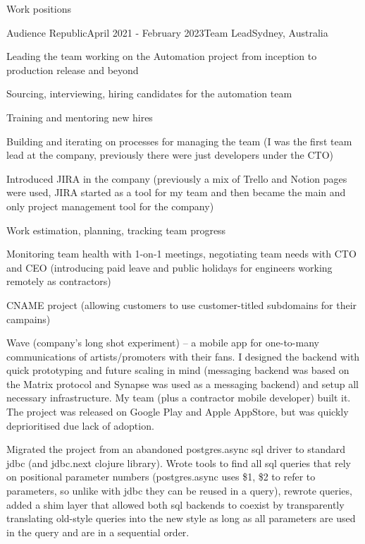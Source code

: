 \documentclass{resume} %
\begin{document}
\begin{rSection}{Work positions}
\begin{rSubsection}{Audience Republic}{April 2021 - February 2023}{Team Lead}{Sydney, Australia} %
\item Leading the team working on the Automation project from inception to production release and beyond
\item Sourcing, interviewing, hiring candidates for the automation team
\item Training and mentoring new hires
\item Building and iterating on processes for managing the team (I was the first team lead at the company,
    previously there were just developers under the CTO)
\item Introduced JIRA in the company (previously a mix of Trello and Notion pages were used, JIRA started as
    a tool for my team and then became the main and only project management tool for the company)
\item Work estimation, planning, tracking team progress
\item Monitoring team health with 1-on-1 meetings, negotiating team needs with CTO and CEO (introducing
    paid leave and public holidays for engineers working remotely as contractors)
\item CNAME project (allowing customers to use customer-titled subdomains for their campains)
\item Wave (company's long shot experiment) -- a mobile app for one-to-many communications of artists/promoters
    with their fans. I designed the backend with quick prototyping and future scaling in mind (messaging
    backend was based on the Matrix protocol and Synapse was used as a messaging backend) and setup all
    necessary infrastructure. My team (plus a contractor mobile developer) built it. The project was released
    on Google Play and Apple AppStore, but was quickly deprioritised due lack of adoption.
\item Migrated the project from an abandoned postgres.async sql driver to standard jdbc (and jdbc.next clojure library).
    Wrote tools to find all sql queries that rely on positional parameter numbers (postgres.async uses \$1, \$2 to refer
    to parameters, so unlike with jdbc they can be reused in a query), rewrote queries, added a shim layer that allowed
    both sql backends to coexist by transparently translating old-style queries into the new style as long as all parameters
    are used in the query and are in a sequential order.
~
\end{rSubsection}


\end{rSection}
\end{document}
